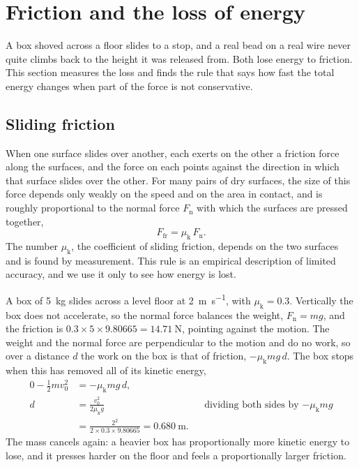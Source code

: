 \section{Friction and the loss of energy}
\label{sec:en-friction}

A box shoved across a floor slides to a stop, and a real bead on a real
wire never quite climbs back to the height it was released from. Both
lose energy to friction. This section measures the loss and finds the
rule that says how fast the total energy changes when part of the force
is not conservative.

\subsection*{Sliding friction}

When one surface slides over another, each exerts on the other a
friction force along the surfaces, and the force on each points against
the direction in which that surface slides over the other. For many pairs of dry surfaces, the size of this force depends only
weakly on the speed and on the area in contact, and is roughly
proportional to the normal force $F_{\mathrm{n}}$ with which the surfaces
are pressed together,
\begin{equation*}
   F_{\mathrm{fr}} = \mu_{\mathrm{k}}\,F_{\mathrm{n}} .
\end{equation*}
The number $\mu_{\mathrm{k}}$, the coefficient of sliding friction,
depends on the two surfaces and is found by measurement. This rule is an empirical description of limited
accuracy, and we use it only to see how energy is lost.

A box of \SI{5}{\kilogram} slides across a level floor at
\SI{2}{\metre\per\second}, with $\mu_{\mathrm{k}} = 0.3$. Vertically the
box does not accelerate, so the normal force balances the weight,
$F_{\mathrm{n}} = mg$, and the friction is $0.3\times5\times9.80665 =
\SI{14.71}{\newton}$, pointing against the motion. The weight and the
normal force are perpendicular to the motion and do no work, so over a
distance $d$ the work on the box is that of friction, $-\mu_{\mathrm{k}}
mg\,d$. The box stops when this has removed all of its kinetic energy,
\begin{align*}
   0 - \tfrac12 m v_0^2 &= -\mu_{\mathrm{k}} m g\,d ,\\
   d &= \frac{v_0^2}{2\mu_{\mathrm{k}}g}
      && \text{dividing both sides by $-\mu_{\mathrm{k}}mg$}\\
   &= \frac{2^2}{2\times0.3\times9.80665} = \SI{0.680}{\metre} .
\end{align*}
The mass cancels again: a heavier box has proportionally more kinetic
energy to lose, and it presses harder on the floor and feels a
proportionally larger friction.

